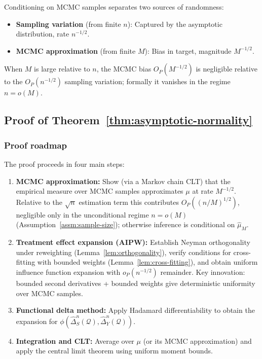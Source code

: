 \begin{remark}
Conditioning on MCMC samples separates two sources of randomness:
\begin{itemize}
\item \textbf{Sampling variation} (from finite $n$): Captured by the asymptotic distribution, rate $n^{-1/2}$.
\item \textbf{MCMC approximation} (from finite $M$): Bias in target, magnitude $M^{-1/2}$.
\end{itemize}
When $M$ is large relative to $n$, the MCMC bias $O_P(M^{-1/2})$ is negligible relative to the $O_P(n^{-1/2})$ sampling variation; formally it vanishes in the regime $n = o(M)$.
\end{remark}

\subsection{Proof of Theorem~\ref{thm:asymptotic-normality}}

\subsubsection{Proof roadmap}

The proof proceeds in four main steps:
\begin{enumerate}
\item \textbf{MCMC approximation:} Show (via a Markov chain CLT) that the empirical measure over MCMC samples approximates $\mu$ at rate $M^{-1/2}$. Relative to the $\sqrt{n}$ estimation term this contributes $O_P((n/M)^{1/2})$, negligible only in the unconditional regime $n = o(M)$ (Assumption~\ref{assm:sample-size}); otherwise inference is conditional on $\hat{\mu}_M$.
\item \textbf{Treatment effect expansion (AIPW):} Establish Neyman orthogonality under reweighting (Lemma~\ref{lem:orthogonality}), verify conditions for cross-fitting with bounded weights (Lemma~\ref{lem:cross-fitting}), and obtain uniform influence function expansion with $o_P(n^{-1/2})$ remainder. Key innovation: bounded second derivatives + bounded weights give deterministic uniformity over MCMC samples.
\item \textbf{Functional delta method:} Apply Hadamard differentiability to obtain the expansion for $\phi(\hat{\Delta}_S^n(\mathcal{Q}), \hat{\Delta}_Y^n(\mathcal{Q}))$.
\item \textbf{Integration and CLT:} Average over $\mu$ (or its MCMC approximation) and apply the central limit theorem using uniform moment bounds.
\end{enumerate}

